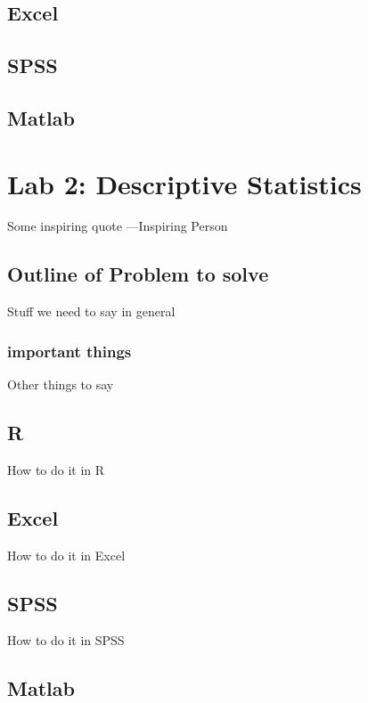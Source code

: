 \documentclass[]{book}
\theoremstyle{definition}
\theoremstyle{definition}
\theoremstyle{definition}
\theoremstyle{remark}
\begin{document}
\section{Excel}\label{excel}

\section{SPSS}\label{spss}

\section{Matlab}\label{matlab}

\chapter{Lab 2: Descriptive
Statistics}\label{lab-2-descriptive-statistics}

{ Some inspiring quote ---Inspiring Person }

\section{Outline of Problem to solve}\label{outline-of-problem-to-solve}

Stuff we need to say in general

\subsection{important things}\label{important-things}

Other things to say

\section{R}\label{r-2}

How to do it in R

\section{Excel}\label{excel-1}

How to do it in Excel

\section{SPSS}\label{spss-1}

How to do it in SPSS

\section{Matlab}\label{matlab-1}
\end{document}
